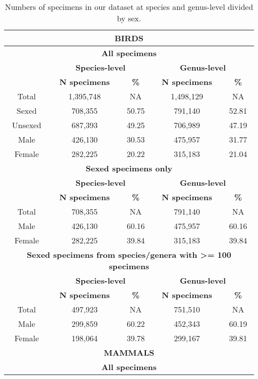 
\begin{longtable}{ccccc}

\caption{Numbers of specimens in our dataset at species and genus-level divided by sex.}\\ 
  
\hline
\multicolumn{5}{c}{\textbf{BIRDS}}\\
\hline
\multicolumn{5}{c}{\textbf{All specimens}}\\
  \hline
  & \multicolumn{2}{c}{\textbf{Species-level}} & \multicolumn{2}{c}{\textbf{Genus-level}} \\
  \hline
  & \textbf{N specimens} & \textbf{\%} & \textbf{N specimens} & \textbf{\%}\\
\hline
Total & 1,395,748 & NA & 1,498,129 & NA\\
Sexed & 708,355 & 50.75 & 791,140 & 52.81\\
Unsexed & 687,393 & 49.25 & 706,989 & 47.19\\
Male & 426,130 & 30.53 & 475,957 & 31.77\\
Female & 282,225 & 20.22 & 315,183 & 21.04\\
\hline
\multicolumn{5}{c}{\textbf{Sexed specimens only}}\\
  \hline
  & \multicolumn{2}{c}{\textbf{Species-level}} & \multicolumn{2}{c}{\textbf{Genus-level}} \\
  \hline
  & \textbf{N specimens} & \textbf{\%} & \textbf{N specimens} & \textbf{\%}\\
\hline
Total & 708,355 & NA & 791,140 & NA \\
Male & 426,130 & 60.16 & 475,957 & 60.16\\
Female & 282,225 & 39.84 & 315,183 & 39.84\\
\hline
\multicolumn{5}{c}{\textbf{Sexed specimens from species/genera with >= 100 specimens}}\\
  \hline
  & \multicolumn{2}{c}{\textbf{Species-level}} & \multicolumn{2}{c}{\textbf{Genus-level}} \\
  \hline
  & \textbf{N specimens} & \textbf{\%} & \textbf{N specimens} & \textbf{\%}\\
\hline
Total & 497,923 & NA & 751,510 & NA\\
Male & 299,859 & 60.22 & 452,343 & 60.19\\
Female & 198,064 & 39.78 & 299,167 & 39.81\\
\hline
\multicolumn{5}{c}{\textbf{MAMMALS}}\\
\hline
\multicolumn{5}{c}{\textbf{All specimens}}\\

\end{longtable}
